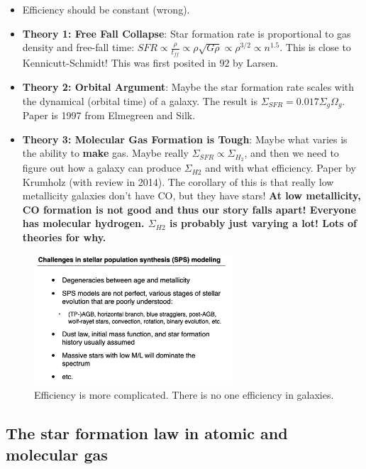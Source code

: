 \documentclass{article}
\begin{document}
\begin{itemize}
    \item Efficiency should be constant (wrong). 
    \item \textbf{Theory 1: Free Fall Collapse}: Star formation rate is proportional to gas density and free-fall time: $SFR \propto \frac{\rho}{t_{ff}} \propto \rho \sqrt{G\rho} \propto \rho^{3/2} \propto n^{1.5}$. This is close to Kennicutt-Schmidt! This was first posited in $92$ by Larsen. 
    \item \textbf{Theory 2: Orbital Argument}: Maybe the star formation rate scales with the dynamical (orbital time) of a galaxy. The result is $\Sigma_{SFR} = 0.017 \Sigma_{g} \Omega_{g}$. Paper is 1997 from Elmegreen and Silk. 
    \item \textbf{Theory 3: Molecular Gas Formation is Tough}: Maybe what varies is the ability to \textbf{make} gas. Maybe really $\Sigma_{SFR} \propto \Sigma_{H_2}$, and then we need to figure out how a galaxy can produce $\Sigma_{H2}$ and with what efficiency. Paper by Krumholz (with review in 2014). The corollary of this is that really low metallicity galaxies don't have CO, but they have stars! \textbf{At low metallicity, CO formation is not good and thus our story falls apart! Everyone has molecular hydrogen. $\Sigma_{H2}$ is probably just varying a lot! Lots of theories for why.}
\end{itemize}

\begin{figure}
    \centering
    \includegraphics[width=0.66\textwidth]{figs/Screen Shot 2021-09-24 at 9.35.27 AM.png}
    \caption{Efficiency is more complicated. There is no one efficiency in galaxies. }
    \label{fig:efficiency_epxl}
\end{figure}


\subsection{The star formation law in atomic and molecular gas}
\end{document}
